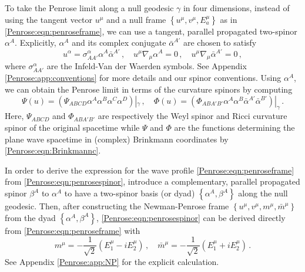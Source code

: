 To take the Penrose limit along a null geodesic $\gamma$ in four dimensions, instead of using the tangent vector $u^{\mu}$ and a null frame $\left\lbrace u^{\mu}, v^{\mu}, E^{\mu}_a \right \rbrace$ as in \eqref{Penrose:eqn:penroseframe}, we can use a tangent, parallel propagated two-spinor $\alpha^{A}$. Explicitly, $\alpha^{A}$ and its complex conjugate $\bar{\alpha}^{A'}$ are chosen to satisfy
\begin{equation}\label{Penrose:eqn:tangentspinor}
u^{\alpha} = \sigma^{\alpha}_{AA'} \alpha^{A}\bar{\alpha}^{A'} \, , \quad	u^{\mu}\nabla_{\mu} \alpha^A = 0 \, , \quad u^{\mu}\nabla_{\mu} \bar{\alpha}^{A'} = 0 \, ,
\end{equation}
where $\sigma^{\alpha}_{AA'}$ are the Infeld-Van der Waerden symbols. See Appendix \ref{Penrose:app:conventions} for more details and our spinor conventions. Using $\alpha^{A}$, we can obtain the Penrose limit in terms of the curvature spinors by computing \cite{Tod:2019urw}
\begin{equation}\label{Penrose:eqn:penrosespinor}
\Psi(u) = \left(\Psi_{ABCD}\alpha^A \alpha^B \alpha^C \alpha^D\right)|_{\gamma} \, , \quad \Phi(u) = \left(\Phi_{ABA'B'}\alpha^A \alpha^B \bar{\alpha}^{A'} \bar{\alpha}^{B'}\right)|_{\gamma} \, .
\end{equation}
Here, $\Psi_{ABCD}$ and $\Phi_{ABA'B'}$ are respectively the Weyl spinor and Ricci curvature spinor of the original spacetime while $\Psi$ and $\Phi$ are the functions determining the plane wave spacetime in (complex) Brinkmann coordinates by \eqref{Penrose:eqn:Brinkmannc}. 

In order to derive the expression for the wave profile \eqref{Penrose:eqn:penroseframe} from \eqref{Penrose:eqn:penrosespinor}, introduce a complementary, parallel propagated spinor $\beta^A$ to $\alpha^A$ to have a two-spinor basis (or dyad) $\left\lbrace \alpha^A, \beta^A\right\rbrace$ along the null geodesic. Then, after constructing the Newman-Penrose frame $\left\lbrace u^{\mu}, v^{\mu}, m^{\mu},\bar{m}^{\mu}  \right \rbrace$ from the dyad $\left\lbrace \alpha^A, \beta^A\right\rbrace$, \eqref{Penrose:eqn:penrosespinor} can be derived directly from \eqref{Penrose:eqn:penroseframe} with
\begin{equation}\label{Penrose:eqn:complextransversebasis}
m^{\mu} = -\frac{1}{\sqrt{2}}\left(E^{\mu}_1 - i E^{\mu}_2 \right) \, , \quad 	\bar{m}^{\mu} = -\frac{1}{\sqrt{2}}\left(E^{\mu}_1 + i E^{\mu}_2 \right) \, .
\end{equation} 
See Appendix \ref{Penrose:app:NP} for the explicit calculation.

